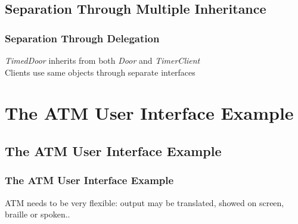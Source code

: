 \documentclass{beamer}
\begin{document}
\subsection{Separation Through Multiple Inheritance}
\begin{frame}
  \frametitle{Separation Through Delegation}
  \textit{TimedDoor} inherits from both \textit{Door} and \textit{TimerClient} \\
  Clients use same objects through separate interfaces \\
  \begin{center}
  \end{center}
\end{frame}

\section{The ATM User Interface Example}
\subsection{The ATM User Interface Example}
\begin{frame}
  \frametitle{The ATM User Interface Example}
  ATM needs to be very flexible: output may be translated, showed on screen, braille or spoken.. \\
  \begin{center}
  \end{center}
\end{frame}
\end{document}
